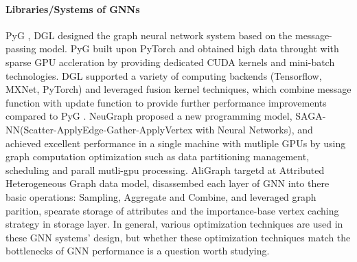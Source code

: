 \paragraph{Libraries/Systems of GNNs}

PyG \cite{PyG}, DGL \cite{DGL} designed the graph neural network system based on the message-passing model.
PyG \cite{PyG} built upon PyTorch and obtained high data throught with sparse GPU accleration by providing dedicated CUDA kernels
and mini-batch technologies. DGL \cite{DGL} supported a variety of computing backends (Tensorflow, MXNet, PyTorch) and leveraged
fusion kernel techniques, which combine message function with update function to provide further performance improvements compared to PyG \cite{PyG}.
NeuGraph \cite{ma2019_neugraph} proposed a new programming model, SAGA-NN(Scatter-ApplyEdge-Gather-ApplyVertex with Neural Networks), and achieved excellent
performance in a single machine with mutliple GPUs by using graph computation optimization such as data partitioning management, scheduling and parall mutli-gpu processing.
AliGraph \cite{zhu2019_aligraph} targetd at Attributed Heterogeneous Graph data model, disassembed each layer of GNN into there basic operations: Sampling, Aggregate and Combine,
and leveraged graph parition, spearate storage of attributes and the importance-base vertex caching strategy in storage layer.
In general, various optimization techniques are used in these GNN systems' design, but whether these optimization techniques match the bottlenecks of GNN performance is a question
worth studying.
